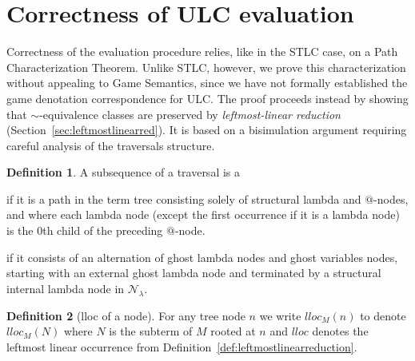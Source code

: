 \documentclass{elsarticle}
\makeatletter
\theoremstyle{plain}
\theoremstyle{definition}
\newtheorem{definition}{Definition}[section]
\newcommand\Nodes{\mathcal{N}}%
\newcommand\NodesLmd{\Nodes_\lambda}%
\renewcommand\ie{{\it i.e.\@\xspace}}
\makeatother
\begin{document}
\section{Correctness of ULC evaluation}
\label{sec:correctness_ulc_normalization}
Correctness of the evaluation procedure relies, like in the STLC case, on a Path Characterization Theorem.
Unlike STLC, however, we prove this characterization without appealing to Game Semantics, since we have not formally established the game denotation correspondence for ULC.
The proof proceeds instead by showing that $\sim$-equivalence classes are preserved by \emph{leftmost-linear reduction} (Section~\ref{sec:leftmostlinearred}). It is based on a bisimulation argument requiring careful analysis of the traversals structure.


\begin{definition}
    \label{def:spinaldescent_pendingarglookup}
A subsequence of a traversal is a
\begin{enumerate*}[nosep,label=(\roman*)]
\item {} if it is a path in the term tree consisting solely of structural lambda and $@$-nodes, and where each lambda node (except the first occurrence if it is a lambda node) is the $0$th child of the preceding $@$-node.
\item {} if it consists of an alternation of ghost lambda nodes and ghost variables nodes, starting with an external ghost lambda node and terminated by a structural internal lambda node in $\NodesLmd$.
\end{enumerate*}
\end{definition}

\begin{definition}[lloc of a node]
For any tree node $n$ we write $lloc_M(n)$ to denote $lloc_M(N)$ where $N$ is the subterm of $M$ rooted at $n$ and $lloc$ denotes the leftmost linear occurrence from Definition~\ref{def:leftmostlinearreduction}.
\end{definition}
\end{document}

